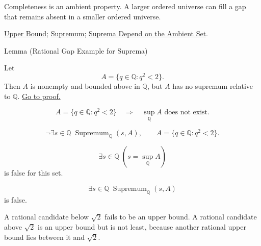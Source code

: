 \begin{remark*}[Interpretation]
Completeness is an ambient property. A larger ordered universe can fill a gap that remains absent in a smaller ordered universe.
\end{remark*}

\begin{remark*}[Dependencies]
\hyperref[def:upper-bound]{Upper Bound};
\hyperref[def:supremum]{Supremum};
\hyperref[prop:suprema-ambient-set]{Suprema Depend on the Ambient Set}.
\end{remark*}



\begin{lemmabox}{Lemma (Rational Gap Example for Suprema)}
\begin{lemma}
\label{lem:rational-gap-suprema}
Let
\[
  A=\{q\in\mathbb{Q}:q^2<2\}.
\]
Then $A$ is nonempty and bounded above in $\mathbb{Q}$, but $A$ has no supremum relative to $\mathbb{Q}$.
\hyperref[prf:rational-gap-suprema]{Go to proof.}
\end{lemma}
\end{lemmabox}

\begin{remark*}
\[
A=\{q\in\mathbb{Q}:q^2<2\}
\quad\Longrightarrow\quad
\sup_{\mathbb{Q}} A\text{ does not exist}.
\]
\end{remark*}

\begin{remark*}
\[
\neg\exists s\in\mathbb{Q}\;\operatorname{Supremum}_{\mathbb{Q}}(s,A),
\qquad
A=\{q\in\mathbb{Q}:q^2<2\}.
\]
\end{remark*}

\begin{remark*}
\[
\exists s\in\mathbb{Q}\;(s=\sup_{\mathbb{Q}}A)
\]
is false for this set.
\end{remark*}

\begin{remark*}
\[
\exists s\in\mathbb{Q}\;\operatorname{Supremum}_{\mathbb{Q}}(s,A)
\]
is false.
\end{remark*}

\begin{remark*}
A rational candidate below $\sqrt{2}$ fails to be an upper bound. A rational candidate above $\sqrt{2}$ is an upper bound but is not least, because another rational upper bound lies between it and $\sqrt{2}$.
\end{remark*}

